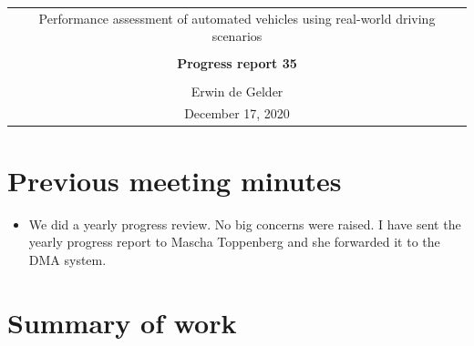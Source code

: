 \documentclass[10pt,final,a4paper,oneside,onecolumn]{article}
\newcommand{\progressreportnumber}{35}
\renewcommand{\author}{Erwin de Gelder}
\renewcommand{\date}{December 17, 2020}
\renewcommand{\title}{Performance assessment of automated vehicles using real-world driving scenarios}
\begin{document}
	
\begin{center}
	\begin{tabular}{c}
		\title \\ \\
		\textbf{\huge Progress report \progressreportnumber} \\ \\
		\author \\ 
		\date
	\end{tabular}
\end{center}

\section{Previous meeting minutes}

\begin{itemize}
	\item We did a yearly progress review. No big concerns were raised. I have sent the yearly progress report to Mascha Toppenberg and she forwarded it to the DMA system.
\end{itemize}

\section{Summary of work}
\end{document}

